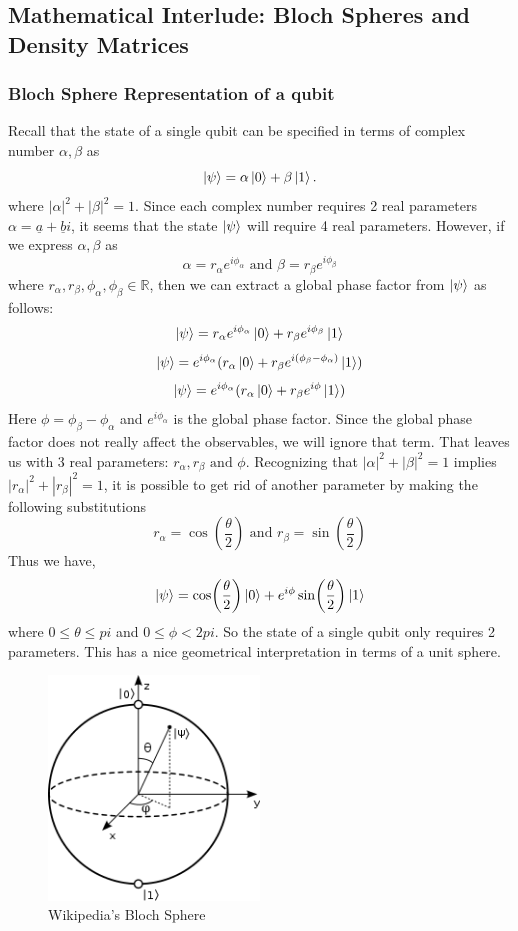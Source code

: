 \documentclass{article}
\begin{document}
\subsection{Mathematical Interlude: Bloch Spheres and Density Matrices}
\subsubsection{Bloch Sphere Representation of a qubit }
Recall that the state of a single qubit can be specified in terms of
complex number \(\alpha, \beta\) as
\[\ket{\psi} = \alpha\ket{0} + \beta\ket{1}. \]
where \(|\alpha|^2 + |\beta|^2 = 1\).
Since each complex number requires 2 real parameters \(\alpha = \underline{a} +
\underline{b}i\), it seems
that the state \(\ket{\psi}\) will require 4 real parameters. However, if we
 express \(\alpha, \beta\) as
\[\alpha = r_\alpha e^{i\phi_{\alpha}} \text{ and }  \beta = r_\beta e^{i\phi_{\beta}}\]
where \(r_\alpha, r_\beta,\phi_{\alpha}, \phi_{\beta} \in \mathbb{R}\), then
we can extract a global phase factor from \(\ket{\psi}\) as follows:
\[\ket{\psi} = r_\alpha e^{i\phi_{\alpha}}\ket{0} + r_\beta e^{i\phi_{\beta}}\ket{1}\]
\[\ket{\psi} = e^{i\phi_{\alpha}}(r_\alpha\ket{0} + r_\beta e^{i(\phi_{\beta} - \phi_{\alpha})}\ket{1})\]
\[\ket{\psi} = e^{i\phi_{\alpha}}(r_\alpha\ket{0} + r_\beta e^{i\phi}\ket{1})\]
Here \(\phi = \phi_{\beta} - \phi_{\alpha}\) and \(e^{i\phi_{\alpha}}\) is the global
phase factor. Since the global phase factor does not really affect the observables,
we will ignore that term. That leaves us with 3 real parameters: \(r_\alpha, r_\beta \text{ and }\phi\).
Recognizing that \(|\alpha|^2 + |\beta|^2 = 1\) implies \(|r_\alpha|^2 + |r_\beta|^2 = 1\), it
is possible to get rid of another parameter by making the following substitutions
\[r_\alpha = \cos(\frac{\theta}{2}) \text{ and } r_\beta = \sin(\frac{\theta}{2})  \]
Thus we have,
\[\ket{\psi} = \cos(\frac{\theta}{2})\ket{0} + e^{i\phi}\sin(\frac{\theta}{2})\ket{1}\]
where \(0 \leq \theta \leq pi\) and \(0 \leq \phi < 2pi\). So the state of a single
qubit only requires 2 parameters. This has a nice geometrical interpretation
in terms of a unit sphere.
\begin{figure}[!htb]
	\centering
	\includegraphics[width=0.5\textwidth]{img/bloch_sphere.png}
	\caption{Wikipedia's Bloch Sphere}
	\label{}
\end{figure}
\end{document}
